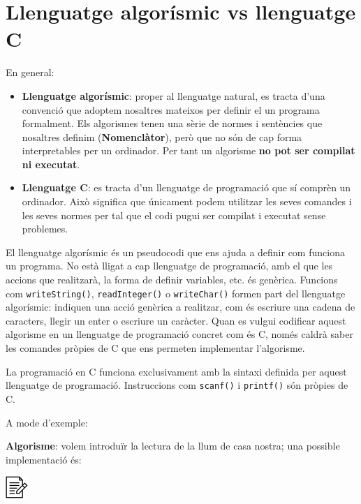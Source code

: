\documentclass[
]{book}
\providecommand{\tightlist}{%
  \setlength{\itemsep}{0pt}\setlength{\parskip}{0pt}}
\begin{document}
\hypertarget{llenguatge-algoruxedsmic-vs-llenguatge-c}{%
\section{Llenguatge algorísmic vs llenguatge C}\label{llenguatge-algoruxedsmic-vs-llenguatge-c}}

En general:

\begin{itemize}
\tightlist
\item
  \textbf{Llenguatge algorísmic}: proper al llenguatge natural, es tracta d'una convenció que adoptem nosaltres mateixos per definir el un programa formalment. Els algorismes tenen una sèrie de normes i sentències que nosaltres definim (\textbf{Nomenclàtor}), però que no són de cap forma interpretables per un ordinador. Per tant un algorisme \textbf{no pot ser compilat ni executat}.
\item
  \textbf{Llenguatge C}: es tracta d'un llenguatge de programació que sí comprèn un ordinador. Això significa que únicament podem utilitzar les seves comandes i les seves normes per tal que el codi pugui ser compilat i executat sense problemes.
\end{itemize}

El llenguatge algorísmic és un pseudocodi que ens ajuda a definir com funciona un programa. No està lligat a cap llenguatge de programació, amb el que les accions que realitzarà, la forma de definir variables, etc. és genèrica. Funcions com \texttt{writeString()}, \texttt{readInteger()} o \texttt{writeChar()} formen part del llenguatge algorísmic: indiquen una acció genèrica a realitzar, com és escriure una cadena de caracters, llegir un enter o escriure un caràcter. Quan es vulgui codificar aquest algorisme en un llenguatge de programació concret com és C, només caldrà saber les comandes pròpies de C que ens permeten implementar l'algorisme.

La programació en C funciona exclusivament amb la sintaxi definida per aquest llenguatge de programació. Instruccions com \texttt{scanf()} i \texttt{printf()} són pròpies de C.

A mode d'exemple:

\textbf{Algorisme}: volem introduïr la lectura de la llum de casa nostra; una possible implementació és:

\includegraphics{./img/alg.png}
\end{document}
